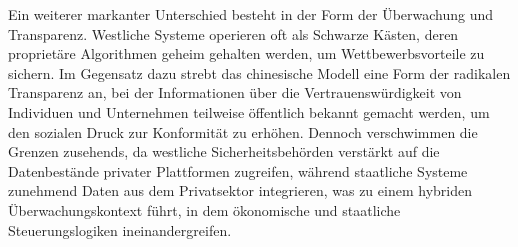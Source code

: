 Ein weiterer markanter Unterschied besteht in der Form der Überwachung und Transparenz. Westliche Systeme operieren oft als Schwarze Kästen, deren proprietäre Algorithmen geheim gehalten werden, um Wettbewerbsvorteile zu sichern. Im Gegensatz dazu strebt das chinesische Modell eine Form der radikalen Transparenz an, bei der Informationen über die Vertrauenswürdigkeit von Individuen und Unternehmen teilweise öffentlich bekannt gemacht werden, um den sozialen Druck zur Konformität zu erhöhen. Dennoch verschwimmen die Grenzen zusehends, da westliche Sicherheitsbehörden verstärkt auf die Datenbestände privater Plattformen zugreifen, während staatliche Systeme zunehmend Daten aus dem Privatsektor integrieren, was zu einem hybriden Überwachungskontext führt, in dem ökonomische und staatliche Steuerungslogiken ineinandergreifen.
